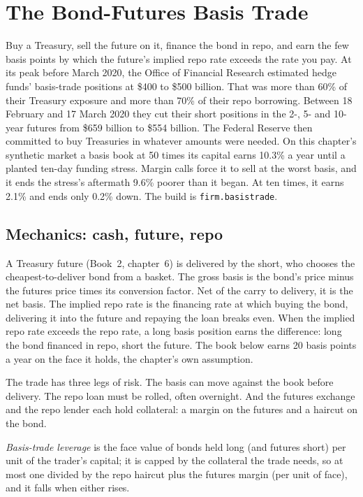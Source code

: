 \chapter{The Bond-Futures Basis Trade}\label{ch:s2:the-bond-futures-basis-trade}

Buy a Treasury, sell the future on it, finance the bond in repo, and earn the few basis points by which the future's implied repo rate exceeds the rate
you pay. At its peak before March 2020, the Office of Financial Research estimated hedge funds' basis-trade positions at \$400 to \$500 billion. That
was more than 60\% of their Treasury exposure and more than 70\% of their repo borrowing. Between 18 February and 17 March 2020 they cut their short
positions in the 2-, 5- and 10-year futures from \$659 billion to \$554 billion. The Federal Reserve then committed to buy Treasuries in whatever
amounts were needed. On this chapter's synthetic market a basis book at 50 times its capital earns 10.3\% a year until a planted ten-day funding
stress. Margin calls force it to sell at the worst basis, and it ends the stress's aftermath 9.6\% poorer than it began. At ten times, it earns 2.1\%
and ends only 0.2\% down. The build is \texttt{firm.basistrade}.

\section{Mechanics: cash, future, repo}

A Treasury future (Book~2, chapter~6) is delivered by the short, who chooses the cheapest-to-deliver bond from a basket. The gross basis is the bond's
price minus the futures price times its conversion factor. Net of the carry to delivery, it is the net basis. The implied repo rate is the financing
rate at which buying the bond, delivering it into the future and repaying the loan breaks even. When the implied repo rate exceeds the repo rate, a
long basis position earns the difference: long the bond financed in repo, short the future. The book below earns 20 basis points a year on the face it
holds, the chapter's own assumption.

The trade has three legs of risk. The basis can move against the book before delivery. The repo loan must be rolled, often overnight. And the futures
exchange and the repo lender each hold collateral: a margin on the futures and a haircut on the bond.

\begin{definition}\label{def:s2:the-bond-futures-basis-trade:leverage}
\emph{Basis-trade leverage} is the face value of bonds held long (and futures short) per unit of the trader's capital; it
is capped by the collateral the trade needs, so at most one divided by the repo haircut plus the futures margin (per unit of face), and it falls when
either rises.
\end{definition}


